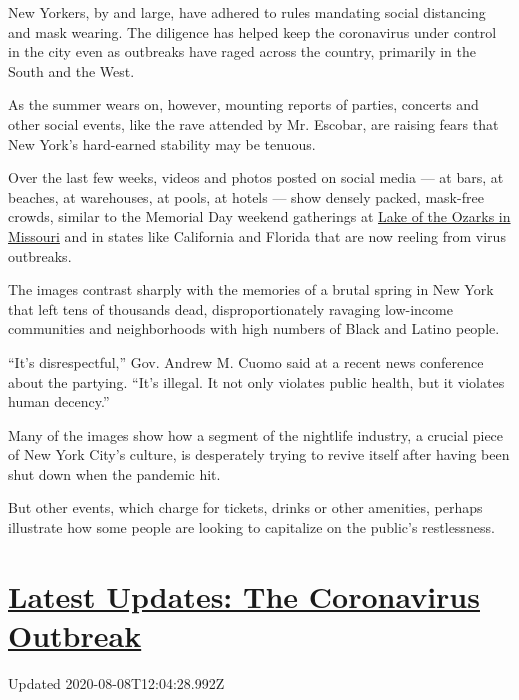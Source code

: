 New Yorkers, by and large, have adhered to rules mandating social
distancing and mask wearing. The diligence has helped keep the
coronavirus under control in the city even as outbreaks have raged
across the country, primarily in the South and the West.

As the summer wears on, however, mounting reports of parties, concerts
and other social events, like the rave attended by Mr. Escobar, are
raising fears that New York's hard-earned stability may be tenuous.

Over the last few weeks, videos and photos posted on social media --- at
bars, at beaches, at warehouses, at pools, at hotels --- show densely
packed, mask-free crowds, similar to the Memorial Day weekend gatherings
at
\href{https://www.nytimes.com/2020/05/26/us/lake-of-the-ozarks-coronavirus.html}{Lake
of the Ozarks in Missouri} and in states like California and Florida
that are now reeling from virus outbreaks.

The images contrast sharply with the memories of a brutal spring in New
York that left tens of thousands dead, disproportionately ravaging
low-income communities and neighborhoods with high numbers of Black and
Latino people.

``It's disrespectful,'' Gov. Andrew M. Cuomo said at a recent news
conference about the partying. ``It's illegal. It not only violates
public health, but it violates human decency.''

Many of the images show how a segment of the nightlife industry, a
crucial piece of New York City's culture, is desperately trying to
revive itself after having been shut down when the pandemic hit.

But other events, which charge for tickets, drinks or other amenities,
perhaps illustrate how some people are looking to capitalize on the
public's restlessness.

\hypertarget{latest-updates-the-coronavirus-outbreak}{%
\section{\texorpdfstring{\href{https://www.nytimes.com/2020/08/07/world/covid-19-news.html?action=click\&pgtype=Article\&state=default\&region=MAIN_CONTENT_1\&context=storylines_live_updates}{Latest
Updates: The Coronavirus
Outbreak}}{Latest Updates: The Coronavirus Outbreak}}\label{latest-updates-the-coronavirus-outbreak}}

Updated 2020-08-08T12:04:28.992Z

